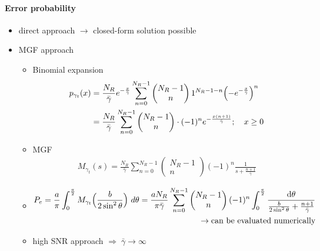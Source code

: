 \documentclass[a4paper, 10pt]{article}
\begin{document}
\paragraph*{Error probability}
	\begin{itemize}
		\item direct approach $\rightarrow$ closed-form solution possible
		\item MGF approach
		\begin{itemize}
			\item Binomial expansion\\
			\begin{align*}
				p_{\gamma _t}(x) &= \frac{N_R}{\bar{\gamma}}e^{-\frac{x}{\bar{\gamma}}}\sum_{n = 0}^{N_R - 1}\begin{pmatrix} N_R - 1 \\ n\end{pmatrix} 1^{N_R - 1 - n}\Bigl( -e^{-\frac{x}{\bar{\gamma}}}\Bigr)^n \\
				&= \frac{N_R}{\bar{\gamma}}\sum_{n = 0}^{N_R - 1}\begin{pmatrix}N_R - 1 \\ n\end{pmatrix}\cdot (-1)^{n}e^{-\frac{x(n + 1)}{\bar{\gamma}}};\quad	x \geq 0
			\end{align*}
			\item MGF\\
			\begin{align*}
				M_{\gamma_t}(s) = \frac{N_R}{\bar{\gamma}}\sum_{n = 0}^{N_R - 1}\begin{pmatrix}N_R - 1\\n\end{pmatrix}(-1)^{n}\frac{1}{s + \frac{n+1}{\bar{\gamma}}}
			\end{align*}
			\item 
			\begin{align*}
				P_e = \frac{a}{\pi}\int_{0}^{\frac{\pi}{2}}M_{\gamma _t}\Bigl(\frac{b}{2\sin^2\theta}\Bigr)~d\theta = \frac{aN_R}{\pi\bar{\gamma}}\sum_{n = 0}^{N_R - 1}\begin{pmatrix}N_R - 1\\ n\end{pmatrix} (-1)^{n}\int_{0}^{\frac{\pi}{2}}\frac{\mathrm{d}\theta}{\frac{b}{2\sin^2\theta} + \frac{n + 1}{\bar{\gamma}}}\\ \rightarrow\text{can be evaluated numerically}				
			\end{align*}
		\item high SNR approach $\Rightarrow \; \bar{\gamma}\rightarrow\infty$

\end{itemize}
\end{itemize}
\end{document}
